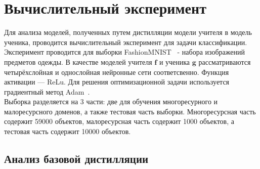 \newpage

\section{Вычислительный эксперимент}

Для анализа моделей, полученных путем дистилляции модели учителя в модель ученика, проводится вычислительный эксперимент для задачи классификации.\\
Эксперимент проводится для выборки FashionMNIST~\cite{FMNIST} - набора изображений предметов одежды. В качестве моделей учителя $\textbf{f}$ и ученика $\textbf{g}$ рассматриваются четырёхслойная и однослойная нейронные сети соответсвенно. Функция активации --- ReLu. Для решения оптимизационной задачи используется градиентный метод Adam~\cite{Adam}.\\
Выборка разделяется на 3 части: две для обучения многоресурного и малоресурсного доменов, а также тестовая часть выборки. Многоресурсная часть содержит 59000 объектов, малоресурсная часть содержит 1000 объектов, а тестовая часть содержит 10000 объектов.

\subsection{Анализ базовой дистилляции}

